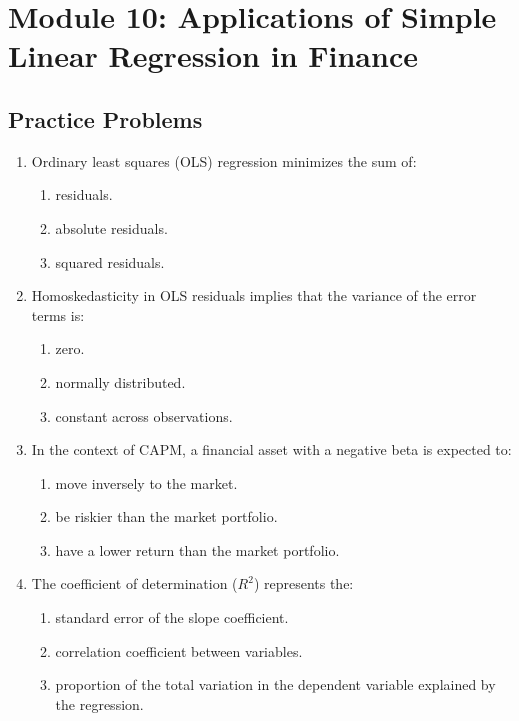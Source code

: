 \newpage

\section{Module 10: Applications of Simple Linear Regression in Finance}
\label{sec:app_Problems_M10}

\subsection{Practice Problems}
\label{subsec:app_Problems_M10}

\begin{enumerate}
	\item Ordinary least squares (OLS) regression minimizes the sum of:
	      \begin{enumerate}[label=\Alph*.]
		      \item residuals.
		      \item absolute residuals.
		      \item squared residuals.
	      \end{enumerate}

	\item Homoskedasticity in OLS residuals implies that the variance of the error terms is:
	      \begin{enumerate}[label=\Alph*.]
		      \item zero.
		      \item normally distributed.
		      \item constant across observations.
	      \end{enumerate}

	\item In the context of CAPM, a financial asset with a negative beta is expected to:
	      \begin{enumerate}[label=\Alph*.]
		      \item move inversely to the market.
		      \item be riskier than the market portfolio.
		      \item have a lower return than the market portfolio.
	      \end{enumerate}

	\item The coefficient of determination ($R^2$) represents the:
	      \begin{enumerate}[label=\Alph*.]
		      \item standard error of the slope coefficient.
		      \item correlation coefficient between variables.
		      \item proportion of the total variation in the dependent variable explained by the regression.
	      \end{enumerate}


\end{enumerate}
